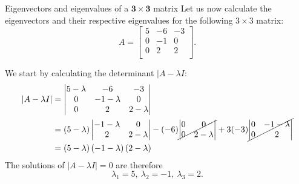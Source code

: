 \begin{example}{Eigenvectors and eigenvalues of a $\bm{3\times3}$ matrix}{}
	Let us now calculate the eigenvectors and their respective eigenvalues for the following $3\times3$ matrix:
	\[
		A=
		\begin{bmatrix}
			5 & -6 & -3\\
			0 & -1 &  0\\
			0 &  2 &  2\\
		\end{bmatrix}.
	\]

	We start by calculating the determinant $|A-\lambda I$:
	\begin{align*}
		|A-\lambda I| &=
		\begin{vmatrix}
			5-\lambda & -6 & -3\\
			0 & -1-\lambda & 0\\
			0 & 2 & 2-\lambda\\
		\end{vmatrix}\\
		&=
		\left(5-\lambda\right)\begin{vmatrix}-1-\lambda & 0 \\ 2 & 2-\lambda\end{vmatrix} -(-6)\cancel{\begin{vmatrix}0&0 \\ 0&2-\lambda\end{vmatrix}} +3 (-3)\cancel{\begin{vmatrix}0&-1-\lambda \\ 0&2\end{vmatrix}}\\
		&= \left(5-\lambda\right) \left( -1-\lambda \right) \left( 2-\lambda \right)\\
	\end{align*}
	The solutions of $|A-\lambda I|=0$ are therefore
	\[
		\lambda_{1}=5,\ \lambda_{2}=-1,\ \lambda_{3}=2.
	\]


\end{example}
